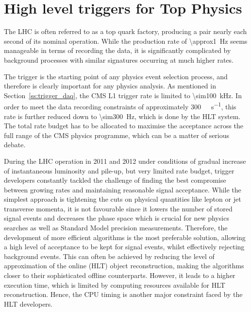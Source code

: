 
\chapter{High level triggers for Top Physics}
\label{c:service_work}
\ifpdf
    \graphicspath{{04_Service_work/plots/}}
\else
    \graphicspath{{04_Service_work/plots/EPS/}{04_Service_work/plots/}}
\fi

The LHC is often referred to as a top quark factory, producing a \ttbar pair nearly each second of its nominal
operation. While the production rate of \SI{\approx1}{\Hz} seems manageable in terms of recording the data, it is
significantly complicated by background processes with similar signatures occurring at much higher rates.

The trigger is the starting point of any physics event selection process, and therefore is clearly important for any
physics analysis. As mentioned in Section~\ref{ss:trigger_daq}, the CMS L1 trigger rate is limited to
\SI{\sim100}{\kilo\hertz}. In order to meet the data recording constraints of approximately
\SI{300}{\mega\byte\per\second}, this rate is further reduced down to \SI{\sim300}{\Hz}, which is done by the HLT
system. The total rate budget has to be allocated to maximise the acceptance across the full range of the CMS physics
programme, which can be a matter of serious debate.

During the LHC operation in 2011 and 2012 under conditions of gradual increase of instantaneous luminosity and pile-up,
but very limited rate budget, trigger developers constantly tackled the challenge of finding the best compromise between
growing rates and maintaining reasonable signal acceptance. While the simplest approach is tightening the cuts on
physical quantities like lepton or jet transverse momenta, it is not favourable since it lowers the number of stored
signal events and decreases the phase space which is crucial for new physics searches as well as Standard Model
precision measurements. Therefore, the development of more efficient algorithms is the most preferable solution,
allowing a high level of acceptance to be kept for signal events, whilst effectively rejecting background events. This
can often be achieved by reducing the level of approximation of the online (HLT) object reconstruction, making the
algorithms closer to their sophisticated offline counterparts. However, it leads to a higher execution time, which is
limited by computing resources available for HLT reconstruction. Hence, the CPU timing is another major constraint faced
by the HLT developers.


